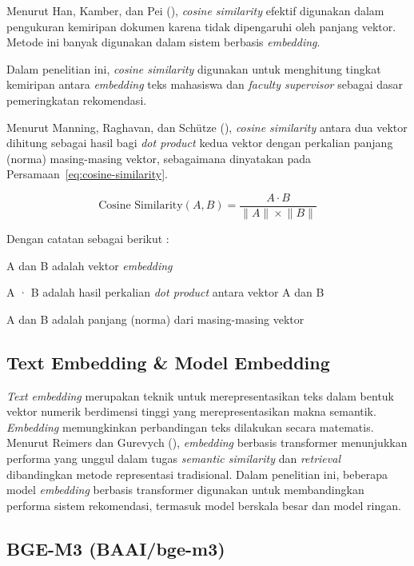 Menurut Han, Kamber, dan Pei (\citeyear{han2012datamining}), \textit{cosine similarity} efektif digunakan dalam pengukuran kemiripan dokumen karena tidak dipengaruhi oleh panjang vektor. Metode ini banyak digunakan dalam sistem berbasis \textit{embedding}.

Dalam penelitian ini, \textit{cosine similarity} digunakan untuk menghitung tingkat kemiripan antara \textit{embedding} teks mahasiswa dan \textit{faculty supervisor} sebagai dasar pemeringkatan rekomendasi.

Menurut Manning, Raghavan, dan Schütze (\citeyear{manning2008ir}), \textit{cosine similarity} antara dua vektor dihitung sebagai hasil bagi \textit{dot product} kedua vektor dengan perkalian panjang (norma) masing-masing vektor, sebagaimana dinyatakan pada Persamaan~\ref{eq:cosine-similarity}.

\begin{equation}\label{eq:cosine-similarity}
\text{Cosine Similarity}(A, B) = \frac{A \cdot B}{\lVert A \rVert \times \lVert B \rVert}
\end{equation}

Dengan catatan sebagai berikut :

A dan B adalah vektor \textit{embedding}

A · B adalah hasil perkalian \textit{dot product} antara vektor A dan B

\textbar\textbar A\textbar\textbar{} dan \textbar\textbar B\textbar\textbar{} adalah panjang (norma) dari masing-masing vektor

\subsection{Text Embedding \& Model Embedding}\label{text-embedding-model-embedding}

\textit{Text embedding} merupakan teknik untuk merepresentasikan teks dalam bentuk vektor numerik berdimensi tinggi yang merepresentasikan makna semantik. \textit{Embedding} memungkinkan perbandingan teks dilakukan secara matematis. Menurut Reimers dan Gurevych (\citeyear{reimers2019sbert}), \textit{embedding} berbasis transformer menunjukkan performa yang unggul dalam tugas \textit{semantic similarity} dan \textit{retrieval} dibandingkan metode representasi tradisional. Dalam penelitian ini, beberapa model \textit{embedding} berbasis transformer digunakan untuk membandingkan performa sistem rekomendasi, termasuk model berskala besar dan model ringan.

\subsection{BGE-M3 (BAAI/bge-m3)}\label{bge-m3-baaibge-m3}

